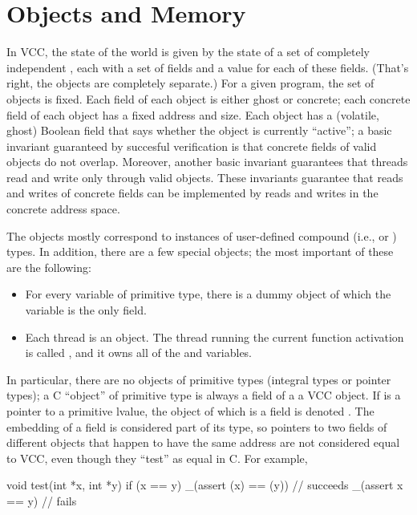 \section{Objects and Memory}
\label{sect:memmodel}
\label{sect:reint}

In VCC, the state of the world is given by the state of a set of
completely independent , each with a set of fields and a value
for each of these fields. (That's right, the objects are completely
separate.) For a given program, the set of objects is fixed. Each
field of each object is either ghost or concrete; each concrete field
of each object has a fixed address and size. Each object has a
(volatile, ghost) Boolean field \vcc{\valid} that says whether the
object is currently ``active''; a basic invariant guaranteed by
succesful verification is that concrete fields of valid objects do not
overlap. Moreover, another basic invariant guarantees that threads
read and write only through valid objects. These invariants guarantee
that reads and writes of concrete fields can be implemented by reads
and writes in the concrete address space.


The objects mostly correspond to instances of user-defined compound
(i.e.,  or ) types. In addition, there are a few
special objects; the most important of these are the following:
\begin{itemize}
\item 
For every variable of primitive type, there is a dummy object of
which the variable is the only field.
\item 
Each thread is an object. The thread running the current function
activation is called \vcc{\me}, and it owns all of the \vcc{\wrapped}
and \vcc{\mutable} variables.
\end{itemize}

In particular, there are no objects of primitive types (integral types
or pointer types); a C ``object'' of primitive type is always
a field of a a VCC object. If 
is a pointer to a primitive lvalue, the object of which  is a
field is denoted . The embedding of a field is
considered part of its type, so pointers to two fields of different
objects that happen to have the same address are not considered equal
to VCC, even though they ``test'' as equal in C. For example,
\begin{VCC}
void test(int *x, int *y) {
  if (x == y) {
    _(assert \addr(x) == \addr(y)) // succeeds
    _(assert x == y)               // fails
  }
}
\end{VCC}

